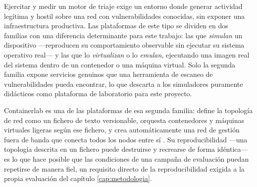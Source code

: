 Ejercitar y medir un motor de triaje exige un entorno donde generar actividad legítima y hostil
sobre una red con vulnerabilidades conocidas, sin exponer una infraestructura productiva. Las
plataformas de este tipo se dividen en dos familias con una diferencia determinante para este
trabajo: las que \emph{simulan} un dispositivo ---reproducen su comportamiento observable sin
ejecutar su sistema operativo real--- y las que lo \emph{virtualizan} o lo \emph{emulan}, ejecutando
una imagen real del sistema dentro de un contenedor o una máquina virtual. Solo la segunda familia
expone servicios genuinos que una herramienta de escaneo de vulnerabilidades pueda encontrar, lo
que descarta a los simuladores puramente didácticos como plataforma de laboratorio para este
proyecto.

Containerlab es una de las plataformas de esa segunda familia: define la topología de red como un
fichero de texto versionable, orquesta contenedores y máquinas virtuales ligeras según ese fichero,
y crea automáticamente una red de gestión fuera de banda que conecta todos los nodos entre sí
\cite{containerlabdocs}. Su reproducibilidad ---una topología descrita en un fichero puede destruirse
y recrearse de forma idéntica--- es lo que hace posible que las condiciones de una campaña de
evaluación puedan repetirse de manera fiel, un requisito directo de la reproducibilidad exigida a
la propia evaluación del capítulo \ref{cap:metodologia}.
